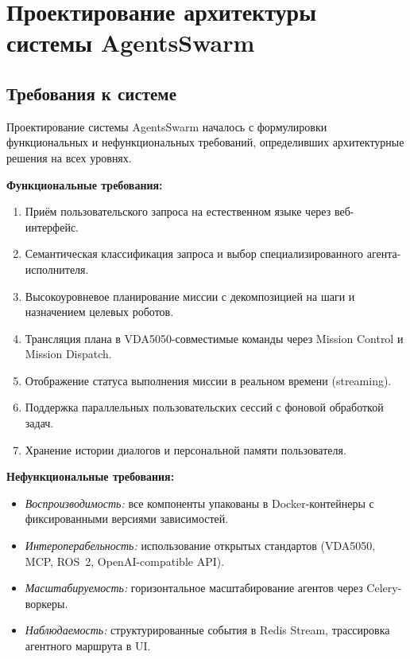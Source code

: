 \documentclass[14pt,a4paper]{extreport}
\begin{document}
\chapter{Проектирование архитектуры системы AgentsSwarm}

\section{Требования к системе}

Проектирование системы AgentsSwarm началось с формулировки функциональных и нефункциональных требований, определивших архитектурные решения на всех уровнях.

\textbf{Функциональные требования:}
\begin{enumerate}
  \item Приём пользовательского запроса на естественном языке через веб-интерфейс.
  \item Семантическая классификация запроса и выбор специализированного агента-исполнителя.
  \item Высокоуровневое планирование миссии с декомпозицией на шаги и назначением целевых роботов.
  \item Трансляция плана в VDA5050-совместимые команды через Mission Control и Mission Dispatch.
  \item Отображение статуса выполнения миссии в реальном времени (streaming).
  \item Поддержка параллельных пользовательских сессий с фоновой обработкой задач.
  \item Хранение истории диалогов и персональной памяти пользователя.
\end{enumerate}

\textbf{Нефункциональные требования:}
\begin{itemize}
  \item \textit{Воспроизводимость:} все компоненты упакованы в Docker-контейнеры с фиксированными версиями зависимостей.
  \item \textit{Интероперабельность:} использование открытых стандартов (VDA5050, MCP, ROS~2, OpenAI-compatible API).
  \item \textit{Масштабируемость:} горизонтальное масштабирование агентов через Celery-воркеры.
  \item \textit{Наблюдаемость:} структурированные события в Redis Stream, трассировка агентного маршрута в UI.
\end{itemize}
\end{document}
